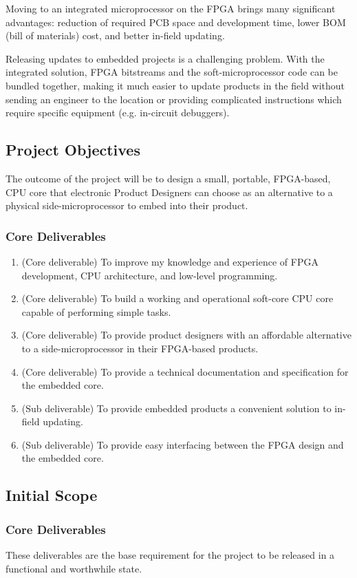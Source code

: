 Moving to an integrated microprocessor on the FPGA brings many significant advantages: reduction of required PCB space and development time, lower BOM (bill of materials) cost, and better in-field updating.

Releasing updates to embedded projects is a challenging problem. With the integrated solution, FPGA bitstreams and the soft-microprocessor code can be bundled together, making it much easier to update products in the field without sending an engineer to the location or providing complicated instructions which require specific equipment (e.g. in-circuit debuggers).

\newpage
\subsection*{Project Objectives}
The outcome of the project will be to design a small, portable, FPGA-based, CPU core that electronic Product Designers can choose as an alternative to a physical side-microprocessor to embed into their product.

\subsubsection*{Core Deliverables}
\begin{enumerate}
\item{(Core deliverable) To improve my knowledge and experience of FPGA  development, CPU architecture, and low-level programming.}
\item{(Core deliverable) To build a working and operational soft-core CPU core capable of performing simple tasks.}
\item{(Core deliverable) To provide product designers with an affordable alternative to a side-microprocessor in their FPGA-based products.}
\item{(Core deliverable) To provide a technical documentation and specification for the embedded core.}
\item{(Sub deliverable) To provide embedded products a convenient solution to in-field updating.}
\item{(Sub deliverable) To provide easy interfacing between the FPGA design and the embedded core.}  
\end{enumerate}

\subsection*{Initial Scope}
\subsubsection*{Core Deliverables}
These deliverables are the base requirement for the project to be released in a functional and worthwhile state.

